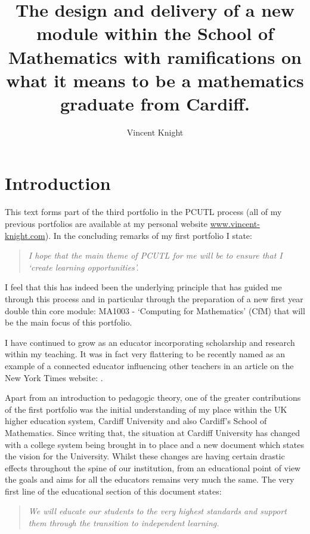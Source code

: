 \documentclass{article}
\title{The design and delivery of a new module within the School of Mathematics with ramifications on what it means to be a mathematics graduate from Cardiff.}
\author{Vincent Knight}
\date{}
\begin{document}
\maketitle

\section{Introduction}

This text forms part of the third portfolio in the PCUTL process (all of my previous portfolios are available at my personal website \url{www.vincent-knight.com}). In the concluding remarks of my first portfolio I state:

\begin{quotation}
    \textit{I hope that the main theme of PCUTL for me will be to ensure that I `create learning opportunities'.}
\end{quotation}

I feel that this has indeed been the underlying principle that has guided me through this process and in particular through the preparation of a new first year double thin core module: MA1003 - `Computing for Mathematics' (CfM) that will be the main focus of this portfolio.

I have continued to grow as an educator incorporating scholarship and research within my teaching. It was in fact very flattering to be recently named as an example of a connected educator influencing other teachers in an article on the New York Times website: \cite{the_new_york_times_what_2013}.

Apart from an introduction to pedagogic theory, one of the greater contributions of the first portfolio was the initial understanding of my place within the UK higher education system, Cardiff University and also Cardiff's School of Mathematics. Since writing that, the situation at Cardiff University has changed with a college system being brought in to place and a new document \cite{cardiff_university_way_2013} which states the vision for the University. Whilst these changes are having certain drastic effects throughout the spine of our institution, from an educational point of view the goals and aims for all the educators remains very much the same. The very first line of the educational section of this document states:

\begin{quotation}
\textit{We will educate our students to the very highest standards and support them through the transition to independent learning. }
\end{quotation}
\end{document}
